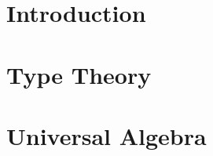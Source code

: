 \documentclass{l4proj}
\begin{document}
%
%
%
%
%
%
%
\chapter{Introduction}



\chapter{Type Theory}


\chapter{Universal Algebra}


\end{document}
